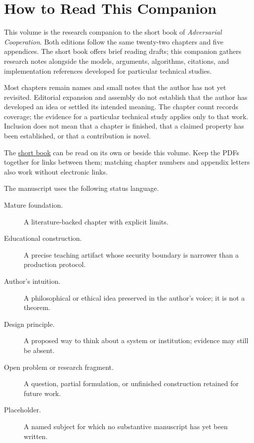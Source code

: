 \chapter*{How to Read This Companion}

This volume is the research companion to the short book of
\emph{Adversarial Cooperation}. Both editions follow the same twenty-two
chapters and five appendices. The short book offers brief reading drafts;
this companion gathers research notes alongside the models, arguments,
algorithms, citations, and implementation references developed for particular
technical studies.

Most chapters remain names and small notes that the author has not yet
revisited. Editorial expansion and assembly do not establish that the author
has developed an idea or settled its intended meaning. The chapter count
records coverage; the evidence for a particular technical study applies only
to that work. Inclusion does not mean that a chapter is finished, that a
claimed property has been established, or that a contribution is novel.

The \href{Adversarial-Cooperation-Short.pdf}{short book} can be read on its own
or beside this volume. Keep the PDFs together for links between them; matching
chapter numbers and appendix letters also work without electronic links.

The manuscript uses the following status language.

\begin{description}
  \item[Mature foundation.] A literature-backed chapter with explicit limits.
  \item[Educational construction.] A precise teaching artifact whose security
  boundary is narrower than a production protocol.
  \item[Author's intuition.] A philosophical or ethical idea preserved in the
  author's voice; it is not a theorem.
  \item[Design principle.] A proposed way to think about a system or
  institution; evidence may still be absent.
  \item[Open problem or research fragment.] A question, partial formulation,
  or unfinished construction retained for future work.
  \item[Placeholder.] A named subject for which no substantive manuscript has
  yet been written.
\end{description}

